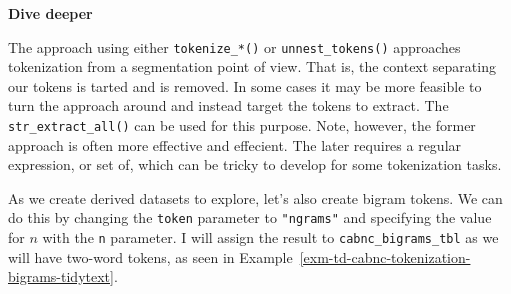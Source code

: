 \documentclass[
  letterpaper,
  DIV=11,
  numbers=noendperiod]{scrreport}
\theoremstyle{definition}
\theoremstyle{remark}
\begin{document}
\begin{tcolorbox}[enhanced jigsaw, breakable, colback=white, rightrule=.15mm, arc=.35mm, left=2mm, toprule=.15mm, leftrule=.75mm, bottomrule=.15mm, opacityback=0]

\textbf{ Dive deeper}

The approach using either \texttt{tokenize\_*()} or
\texttt{unnest\_tokens()} approaches tokenization from a segmentation
point of view. That is, the context separating our tokens is tarted and
is removed. In some cases it may be more feasible to turn the approach
around and instead target the tokens to extract. The
\texttt{str\_extract\_all()} can be used for this purpose. Note,
however, the former approach is often more effective and effecient. The
later requires a regular expression, or set of, which can be tricky to
develop for some tokenization tasks.

\end{tcolorbox}

As we create derived datasets to explore, let's also create bigram
tokens. We can do this by changing the \texttt{token} parameter to
\texttt{"ngrams"} and specifying the value for \(n\) with the \texttt{n}
parameter. I will assign the result to \texttt{cabnc\_bigrams\_tbl} as
we will have two-word tokens, as seen in
Example~\ref{exm-td-cabnc-tokenization-bigrams-tidytext}.
\end{document}

